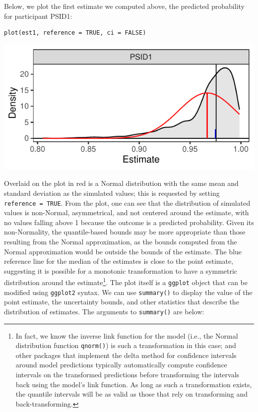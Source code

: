 Below, we plot the first estimate we computed above, the predicted probability for participant PSID1:
\begin{verbatim}
plot(est1, reference = TRUE, ci = FALSE)
\end{verbatim}
\begin{center}\includegraphics{figures/plot1-1} \end{center}
Overlaid on the plot in red is a Normal distribution with the same mean and standard deviation as the simulated values; this is requested by setting \texttt{reference\ =\ TRUE}. From the plot, one can see that the distribution of simulated values is non-Normal, asymmetrical, and not centered around the estimate, with no values falling above 1 because the outcome is a predicted probability. Given its non-Normality, the quantile-based bounds may be more appropriate than those resulting from the Normal approximation, as the bounds computed from the Normal approximation would be outside the bounds of the estimate. The blue reference line for the median of the estimates is close to the point estimate, suggesting it is possible for a monotonic transformation to have a symmetric distribution around the estimate\footnote{In fact, we know the inverse link function for the model (i.e., the Normal distribution function \texttt{qnorm()}) is such a transformation in this case;  and other packages that implement the delta method for confidence intervals around model predictions typically automatically compute confidence intervals on the transformed predictions before transforming the intervals back using the model's link function. As long as such a transformation exists, the quantile intervals will be as valid as those that rely on transforming and back-transforming.}. The plot itself is a \texttt{ggplot} object that can be modified using \texttt{ggplot2} syntax.
We can use \texttt{summary()} to display the value of the point estimate, the uncertainty bounds, and other statistics that describe the distribution of estimates. The arguments to \texttt{summary()} are below:
